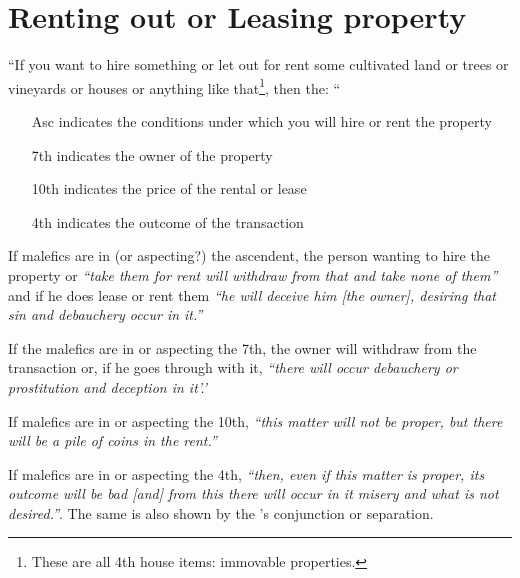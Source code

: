 \section{Renting out or Leasing property}
``If  you want to hire something or let out for rent some cultivated land or trees or vineyards or houses or anything like that\footnote{These are all 4th house items: immovable properties.}, then the: ``
\begin{itemize}[topsep=0em,itemsep=0em]
\item[Asc] indicates the conditions under which you will hire or rent the property
\item[7th] indicates the owner of the property
\item[10th] indicates the price of the rental or lease
\item[4th] indicates the outcome of the transaction
\end{itemize}

If  malefics are in (or aspecting?) the ascendent, the person wanting to hire the property or \textsl{``take them for rent will withdraw from that and take none of them''} and if he does lease or rent them \textsl{``he will deceive him [the owner], desiring that sin and debauchery occur in it.''}

If  the malefics are in or aspecting the 7th, the owner will withdraw from the transaction or, if he goes through with it, \textsl{``there will occur debauchery or prostitution and deception in it'.'}

If  malefics are in or aspecting the 10th, \textsl{``this matter will not be proper, but there will be a pile of coins in the rent.''}

If  malefics are in or aspecting the 4th, \textsl{``then, even if this matter is proper, its outcome will be bad [and] from this there will occur in it misery and what is not desired.''}. The same is also shown by the \Moon's conjunction or separation.




